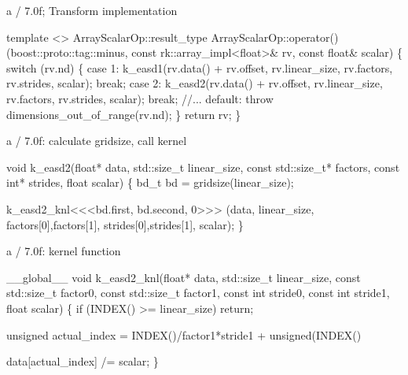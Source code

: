 \documentclass[9pt]{beamer}
\begin{document}

\begin{frame}[fragile]{a / 7.0f; Transform implementation}
\begin{semiverbatim}template <>
ArrayScalarOp::result_type
ArrayScalarOp::operator()(boost::proto::tag::minus, 
                          const rk::array_impl<float>& rv, 
                          const float& scalar)
\{
  switch (rv.nd) \{
    case 1:  k_easd1(rv.data() + rv.offset, rv.linear_size, 
                    rv.factors, rv.strides, 
                    scalar); break;
    case 2:  k_easd2(rv.data() + rv.offset, rv.linear_size, 
                    rv.factors, rv.strides, 
                    scalar); break;
    //...
        default:
    throw dimensions_out_of_range(rv.nd);
  \}
  return rv;
\}
\end{semiverbatim}
\end{frame}

\begin{frame}[fragile]{a / 7.0f: calculate gridsize, call kernel}
\begin{semiverbatim}
void k_easd2(float* data, 
             std::size_t linear_size,
             const std::size_t* factors, 
             const int* strides,
             float scalar)
\{
  bd_t bd = gridsize(linear_size);

  k_easd2_knl<\hskip0pt<\hskip0pt<bd.first, bd.second, 0>\hskip0pt>\hskip0pt>
    (data,
     linear_size,
     factors[0],factors[1],
     strides[0],strides[1],
     scalar);
\}
\end{semiverbatim}
\end{frame}


\begin{frame}[fragile]{a / 7.0f: kernel function}
\begin{semiverbatim}__global__ void
k_easd2_knl(float* data,
            std::size_t linear_size,
            const std::size_t factor0, const std::size_t factor1,
            const int stride0, const int stride1,
            float scalar)
\{
  if (INDEX() >= linear_size)
    return;

  unsigned actual_index = 
    INDEX()/factor1*stride1 
    +  unsigned(INDEX() %

  data[actual_index] /= scalar;
\}
\end{semiverbatim}
\end{frame}
\end{document}
